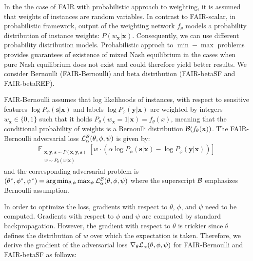 \documentclass[preprint,12pt]{elsarticle}
\begin{document}
In the the case of FAIR with probabilistic approach to weighting, it is assumed that  weights of instances are random variables. 
In contrast to FAIR-scalar, in probabilistic framework, output of the weighting network $f_\theta$ models a probability distribution of instance weights: $P(w_\mathbf{x}|\mathbf{x})$. Consequently, we can use different probability distribution models. Probabilistic approch to $\min-\max$ problems provides guarantees of existence of mixed Nash equilibrium in the cases when pure Nash equilibrium does not exist \cite{tadelis2013game} and could therefore yield better results. We consider Bernoulli (FAIR-Bernoulli) and beta distribution (FAIR-betaSF and FAIR-betaREP). 

FAIR-Bernoulli assumes that log likelihoods of instances, with respect to sensitive features $\log P_{\psi}(\mathbf{s}|\mathbf{x})$ and labels $\log P_{\phi}(\mathbf{y}|\mathbf{x})$ are weighted by integers $w_\mathbf{x} \in \{0,1\}$ such that it holds $P_\theta(w_\mathbf{x}=1|\mathbf{x})=f_\theta(x)$, meaning that the conditional probability of weights is a Bernoulli distribution ${\cal B}(f_\theta(\mathbf{x}))$. The FAIR-Bernoulli adversarial loss ${\cal L}^{\cal B}_{\alpha}(\theta, \phi, \psi)$ is given by:
\begin{gather}
\label{Eq:Loss_prob}
\mathbb{E}_{\substack{\mathbf{x},\mathbf{y}, \mathbf{s} \sim P\left(\mathbf{x},\mathbf{y}, \mathbf{s}\right)\\w \sim P_\theta(w|\mathbf{x})}}  \left[ w \cdot(\alpha\log P_{\psi}\left(\mathbf{s}|\mathbf{x}\right)
-  \log P_{\phi}\left(\mathbf{y}|\mathbf{x}\right))\right]
\end{gather}
and the corresponding adversarial problem is $(\theta^*,\phi^*,\psi^*) = \arg\min_{\theta,\phi}\max_{\psi}{\cal L}^{\cal B}_\alpha(\theta,\phi,\psi)$
where the superscript ${\cal B}$ emphasizes Bernoulli assumption.

In order to optimize the loss, gradients with respect to $\theta$, $\phi$, and $\psi$ need to be computed. Gradients with respect to $\phi$ and $\psi$ are computed by standard backpropagation. However, the gradient with respect to $\theta$ is trickier since $\theta$ defines the distribution of $w$ over which the expectation is taken. Therefore, we derive the gradient of the adversarial loss $\nabla_{\theta}{\cal L}_{\alpha}(\theta, \phi, \psi)$ for FAIR-Bernoulli and FAIR-betaSF as follows:
\end{document}

